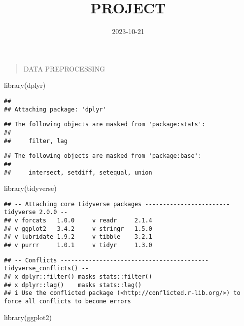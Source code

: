 \documentclass[
]{article}
\title{PROJECT}
\author{}
\date{\vspace{-2.5em}2023-10-21}
\newenvironment{Shaded}{\begin{snugshade}}{\end{snugshade}}
\newcommand{\FunctionTok}[1]{\textcolor[rgb]{0.00,0.00,0.00}{#1}}
\newcommand{\NormalTok}[1]{#1}
\begin{document}
\maketitle

\begin{quote}
DATA PREPROCESSING
\end{quote}

\begin{Shaded}
\begin{Highlighting}[]
\FunctionTok{library}\NormalTok{(dplyr)}
\end{Highlighting}
\end{Shaded}

\begin{verbatim}
## 
## Attaching package: 'dplyr'
\end{verbatim}

\begin{verbatim}
## The following objects are masked from 'package:stats':
## 
##     filter, lag
\end{verbatim}

\begin{verbatim}
## The following objects are masked from 'package:base':
## 
##     intersect, setdiff, setequal, union
\end{verbatim}

\begin{Shaded}
\begin{Highlighting}[]
\FunctionTok{library}\NormalTok{(tidyverse)}
\end{Highlighting}
\end{Shaded}

\begin{verbatim}
## -- Attaching core tidyverse packages ------------------------ tidyverse 2.0.0 --
## v forcats   1.0.0     v readr     2.1.4
## v ggplot2   3.4.2     v stringr   1.5.0
## v lubridate 1.9.2     v tibble    3.2.1
## v purrr     1.0.1     v tidyr     1.3.0
\end{verbatim}

\begin{verbatim}
## -- Conflicts ------------------------------------------ tidyverse_conflicts() --
## x dplyr::filter() masks stats::filter()
## x dplyr::lag()    masks stats::lag()
## i Use the conflicted package (<http://conflicted.r-lib.org/>) to force all conflicts to become errors
\end{verbatim}

\begin{Shaded}
\begin{Highlighting}[]
\FunctionTok{library}\NormalTok{(ggplot2)}
\end{Highlighting}
\end{Shaded}
\end{document}
